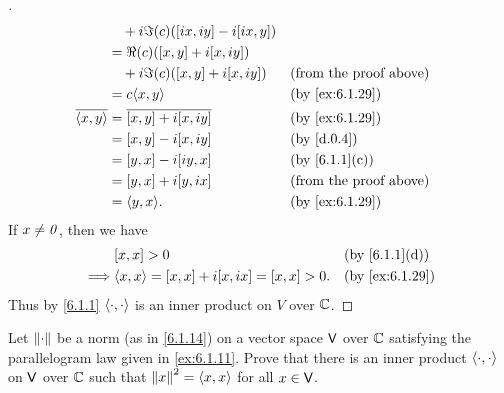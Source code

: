 \begin{proof}[]
\begin{align*}
                      & \quad + i \Im(c) ([ix, iy] - i[ix, y])                                                          \\
                      & = \Re(c) ([x, y] + i[x, iy])                                                                    \\
                      & \quad + i \Im(c) ([x, y] + i[x, iy])                        &  & \text{(from the proof above)}  \\
                      & = c \inn{x, y}                                              &  & \text{(by \cref{ex:6.1.29})}   \\
    \conj{\inn{x, y}} & = \conj{[x, y] + i[x, iy]}                                  &  & \text{(by \cref{ex:6.1.29})}   \\
                      & = [x, y] - i[x, iy]                                         &  & \text{(by \cref{d.0.4})}       \\
                      & = [y, x] - i[iy, x]                                         &  & \text{(by \cref{6.1.1}(c))}    \\
                      & = [y, x] + i[y, ix]                                         &  & \text{(from the proof above)}  \\
                      & = \inn{y, x}.                                               &  & \text{(by \cref{ex:6.1.29})}
  \end{align*}
  If \(x \neq \mathit{0}\), then we have
  \begin{align*}
             & [x, x] > 0                                   &  & \text{(by \cref{6.1.1}(d))}  \\
    \implies & \inn{x, x} = [x, x] + i[x, ix] = [x, x] > 0. &  & \text{(by \cref{ex:6.1.29})}
  \end{align*}
  Thus by \cref{6.1.1} \(\left\langle\cdot, \cdot\right\rangle\) is an inner product on \(V\) over \(\mathbb{C}\).
\end{proof}

\begin{ex}\label{ex:6.1.30}
  Let \(\left\lVert\cdot\right\rVert\) be a norm (as in \cref{6.1.14}) on a vector space \(\mathsf{V}\) over \(\mathbb{C}\) satisfying the parallelogram law given in \cref{ex:6.1.11}.
  Prove that there is an inner product \(\left\langle\cdot, \cdot\right\rangle\) on \(\mathsf{V}\) over \(\mathbb{C}\) such that \(\left\lVert x\right\rVert^2 = \left\langle x, x\right\rangle\) for all \(x \in \mathsf{V}\).
\end{ex}


